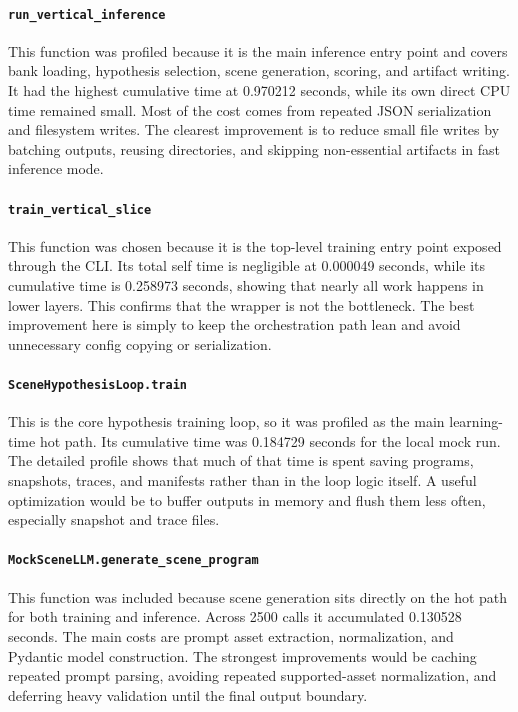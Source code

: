 \documentclass{article}
\begin{document}
\paragraph{\texttt{run\_vertical\_inference}}
This function was profiled because it is the main inference entry point and covers bank loading, hypothesis selection, scene generation, scoring, and artifact writing. It had the highest cumulative time at 0.970212 seconds, while its own direct CPU time remained small. Most of the cost comes from repeated JSON serialization and filesystem writes. The clearest improvement is to reduce small file writes by batching outputs, reusing directories, and skipping non-essential artifacts in fast inference mode.

\paragraph{\texttt{train\_vertical\_slice}}
This function was chosen because it is the top-level training entry point exposed through the CLI. Its total self time is negligible at 0.000049 seconds, while its cumulative time is 0.258973 seconds, showing that nearly all work happens in lower layers. This confirms that the wrapper is not the bottleneck. The best improvement here is simply to keep the orchestration path lean and avoid unnecessary config copying or serialization.

\paragraph{\texttt{SceneHypothesisLoop.train}}
This is the core hypothesis training loop, so it was profiled as the main learning-time hot path. Its cumulative time was 0.184729 seconds for the local mock run. The detailed profile shows that much of that time is spent saving programs, snapshots, traces, and manifests rather than in the loop logic itself. A useful optimization would be to buffer outputs in memory and flush them less often, especially snapshot and trace files.

\paragraph{\texttt{MockSceneLLM.generate\_scene\_program}}
This function was included because scene generation sits directly on the hot path for both training and inference. Across 2500 calls it accumulated 0.130528 seconds. The main costs are prompt asset extraction, normalization, and Pydantic model construction. The strongest improvements would be caching repeated prompt parsing, avoiding repeated supported-asset normalization, and deferring heavy validation until the final output boundary.
\end{document}
